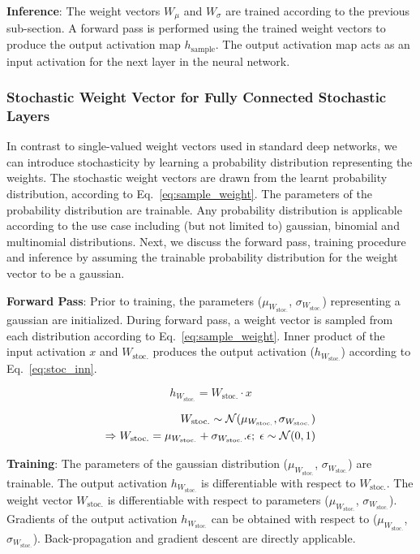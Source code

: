 \documentclass[12pt, letterpaper]{article}
\begin{document}
\textbf{Inference}:
The weight vectors $W_\mu$ and $W_\sigma$ are trained according to the previous sub-section. A forward pass is performed using the trained weight vectors to produce the output activation map $h_\mathrm{sample}$. The output activation map acts as an input activation for the next layer in the neural network.

\subsubsection{Stochastic Weight Vector for Fully Connected Stochastic Layers} 

In contrast to single-valued weight vectors used in standard deep networks, we can introduce stochasticity by learning a probability distribution representing the weights. The stochastic weight vectors are drawn from the learnt probability distribution, according to Eq.~\eqref{eq:sample_weight}. The parameters of the probability distribution are trainable. 
Any probability distribution is applicable according to the use case including (but not limited to) gaussian, binomial and multinomial distributions.  
Next, we discuss the forward pass, training procedure and inference by assuming the trainable probability distribution for the weight vector to be a gaussian. 

\textbf{Forward Pass}: Prior to training, the parameters ($\mu_{W_\mathrm{stoc.}}$, $\sigma_{W_\mathrm{stoc.}}$) representing a gaussian are initialized. During forward pass, a weight vector is sampled from each distribution according to Eq.~\eqref{eq:sample_weight}. Inner product of the input activation $x$ and $W_\mathrm{stoc.}$ produces the output activation ($h_{W_\mathrm{stoc.}}$) according to Eq.~\eqref{eq:stoc_inn}.

\begin{equation}
h_{W_\mathrm{stoc.}}=W_\mathrm{stoc.} \cdot x
\label{eq:stoc_inn}
\end{equation}
 
\begin{align}
  W_\mathrm{stoc.} \sim \mathcal{N}(\mu_{W_\mathrm{stoc.}},\sigma_{W_\mathrm{stoc.}}) \notag\\
  \Rightarrow W_\mathrm{stoc.}=\mu_{W_\mathrm{stoc.}} + \sigma_{W_\mathrm{stoc.}}.\epsilon;\; \epsilon \sim \mathcal{N}(0,1)
  \label{eq:sample_weight}
\end{align}

\textbf{Training}: The parameters of the gaussian distribution ($\mu_{W_\mathrm{stoc.}}$, $\sigma_{W_\mathrm{stoc.}}$) are trainable. The output activation $h_{W_\mathrm{stoc.}}$ is differentiable with respect to $W_\mathrm{stoc.}$. The weight vector $W_\mathrm{stoc.}$ is differentiable with respect to parameters ($\mu_{W_\mathrm{stoc.}}$, $\sigma_{W_\mathrm{stoc.}}$). Gradients of the output activation $h_{W_\mathrm{stoc.}}$ can be obtained with respect to ($\mu_{W_\mathrm{stoc.}}$, $\sigma_{W_\mathrm{stoc.}}$). Back-propagation and gradient descent are directly applicable. 
\end{document}
